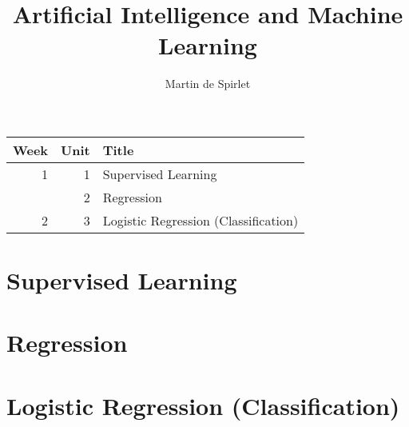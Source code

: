 \documentclass[
  11pt,
  a4paper,
]{article}
\title{Artificial Intelligence and Machine Learning}
\author{Martin de Spirlet}
\date{}
\begin{document}

\maketitle

\vspace*{\fill}

\begin{table}[htp]
  \centering
  \begin{tabular}{rrl}
    \toprule
    Week & Unit & Title \\
    \midrule
    1 & 1 & Supervised Learning \\
      & 2 & Regression \\ [1ex]
    2 & 3 & Logistic Regression (Classification) \\
    \bottomrule
  \end{tabular}
\end{table}

\vspace*{\fill}
\addvspace{1in}

\clearpage


\section{Supervised Learning}


\section{Regression}


\section{Logistic Regression (Classification)}

\end{document}
